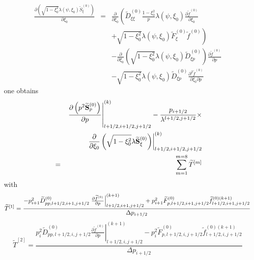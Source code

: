 \begin{eqnarray}
\frac{\partial \left( \sqrt{1-\xi _{0}^{2}}\lambda \left( \psi ,\xi
_{0}\right) \widetilde{S}_{\xi }^{\left( 0\right) }\right) }{\partial \xi
_{0}} &=&\frac{\partial }{\partial \xi _{0}}\left( \widetilde{D}_{\xi \xi
}^{\left( 0\right) }\frac{1-\xi _{0}^{2}}{p}\lambda \left( \psi ,\xi
_{0}\right) \frac{\partial \widetilde{f}^{\left( 0\right) }}{\partial \xi
_{0}}\right.   \nonumber \\
&&\left. +\sqrt{1-\xi _{0}^{2}}\lambda \left( \psi ,\xi _{0}\right)
\widetilde{F}_{\xi }^{\left( 0\right) }\widetilde{f}^{\left( 0\right)
}\right)   \nonumber \\
&&-\frac{\partial }{\partial \xi _{0}}\left( \sqrt{1-\xi _{0}^{2}}\lambda
\left( \psi ,\xi _{0}\right) \widetilde{D}_{\xi p}^{\left( 0\right) }\right)
\frac{\partial \widetilde{f}^{\left( 0\right) }}{\partial p}  \nonumber \\
&&-\sqrt{1-\xi _{0}^{2}}\lambda \left( \psi ,\xi _{0}\right) \widetilde{D}%
_{\xi p}^{\left( 0\right) }\frac{\partial ^{2}\widetilde{f}^{\left( 0\right)
}}{\partial \xi _{0}\partial p}
\end{eqnarray}
one obtains
\begin{eqnarray}
&&\left. \frac{\partial \left( p^{2}\widetilde{\mathbf{S}}_{p}^{\left(
0\right) }\right) }{\partial p}\right| _{l+1/2,i+1/2,j+1/2}^{(k)}-\frac{%
p_{i+1/2}}{\lambda ^{l+1/2,j+1/2}}\times   \nonumber \\
&&\left. \frac{\partial }{\partial \xi _{0}}\left( \sqrt{1-\xi _{0}^{2}}%
\lambda \widetilde{\mathbf{S}}_{\xi }^{\left( 0\right) }\right) \right|
_{l+1/2,i+1/2,j+1/2}^{(k)}  \nonumber \\
&=&\sum_{m=1}^{m=8}\widetilde{T}^{\left[ m\right] }
\end{eqnarray}
with
\begin{equation}
\widetilde{T}^{\left[ 1\right] }=\frac{-p_{i+1}^{2}\widetilde{D}%
_{pp,l+1/2,i+1,j+1/2}^{\left( 0\right) }\left. \frac{\partial \widetilde{f}%
^{\left( 0\right) }}{\partial p}\right|
_{l+1/2,i+1,j+1/2}^{(k+1)}+p_{i+1}^{2}\widetilde{F}_{p,l+1/2,i+1,j+1/2}^{%
\left( 0\right) }\widetilde{f}_{l+1/2,i+1,j+1/2}^{\left( 0\right) (k+1)}}{%
\Delta p_{i+1/2}}
\end{equation}
\begin{equation}
\widetilde{T}^{\left[ 2\right] }=\frac{p_{i}^{2}\widetilde{D}%
_{pp,l+1/2,i,j+1/2}^{\left( 0\right) }\left. \frac{\partial \widetilde{f}%
^{\left( 0\right) }}{\partial p}\right| _{l+1/2,i,j+1/2}^{(k+1)}-p_{i}^{2}%
\widetilde{F}_{p,l+1/2,i,j+1/2}^{\left( 0\right) }\widetilde{f}%
_{l+1/2,i,j+1/2}^{\left( 0\right) (k+1)}}{\Delta p_{i+1/2}}
\end{equation}
